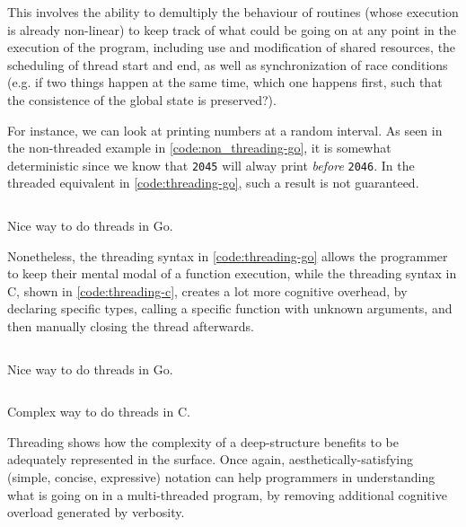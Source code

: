 This involves the ability to demultiply the behaviour of routines (whose execution is already non-linear) to keep track of what could be going on at any point in the execution of the program, including use and modification of shared resources, the scheduling of thread start and end, as well as synchronization of race conditions (e.g. if two things happen at the same time, which one happens first, such that the consistence of the global state is preserved?).

For instance, we can look at printing numbers at a random interval. As seen in the non-threaded example in \autoref{code:non_threading-go}, it is somewhat deterministic since we know that \lstinline{2045} will alway print \emph{before} \lstinline{2046}. In the threaded equivalent in \autoref{code:threading-go}, such a result is not guaranteed.

\begin{listing}
  \inputminted{python}{./corpus/non_thread.go}
  \caption{Nice way to do threads in Go.}
  \label{code:non_threading-go}
\end{listing}

Nonetheless, the threading syntax in \autoref{code:threading-go} allows the programmer to keep their mental modal of a function execution, while the threading syntax in C, shown in \autoref{code:threading-c}, creates a lot more cognitive overhead, by declaring specific types, calling a specific function with unknown arguments, and then manually closing the thread afterwards.

\begin{listing}
  \inputminted{python}{./corpus/thread.go}
  \caption{Nice way to do threads in Go.}
  \label{code:threading-go}
\end{listing}

\begin{listing}
  \inputminted{python}{./corpus/thread.c}
  \caption{Complex way to do threads in C.}
  \label{code:threading-c}
\end{listing}

Threading shows how the complexity of a deep-structure benefits to be adequately represented in the surface. Once again, aesthetically-satisfying (simple, concise, expressive) notation can help programmers in understanding what is going on in a multi-threaded program, by removing additional cognitive overload generated by verbosity.

